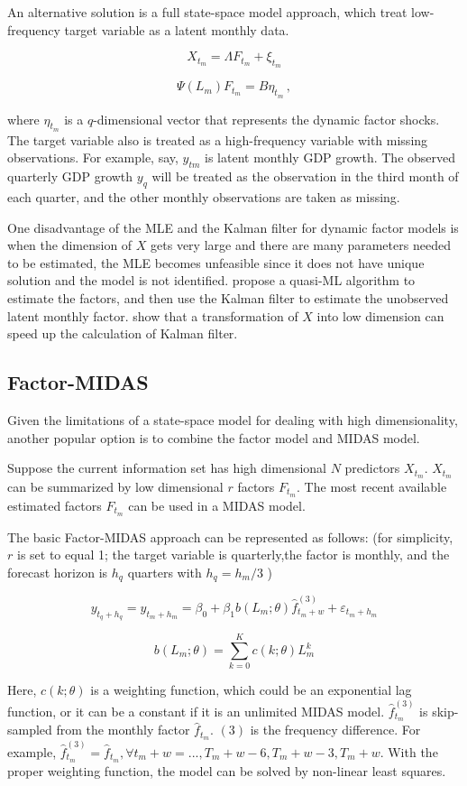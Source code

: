 An alternative solution is a full state-space model approach, which treat low-frequency target variable as a latent monthly data.   

$$X_{t_m} = \Lambda F_{t_m} + \xi_{t_m}$$

$$\Psi (L_m) F_{t_m} = B \eta_{t_m} \, ,$$

where $\eta_{t_m}$ is a $q$-dimensional vector that represents the dynamic factor shocks. The target variable also is treated as a high-frequency variable with missing observations. For example, say, $y_{tm}$ is latent monthly GDP growth. The observed quarterly GDP growth $y_q$ will be treated as the observation in the third month of each quarter, and the other monthly observations are taken as missing.

One disadvantage of the MLE and the Kalman filter for dynamic factor models is when the dimension of $X$  gets very large and there are many parameters needed to be estimated, the MLE becomes unfeasible since it does not have unique solution and the model is not identified.    propose a quasi-ML algorithm to estimate the factors, and then use the Kalman filter  to estimate the unobserved latent monthly factor.   show that a transformation of $X$ into low dimension can speed up the calculation of Kalman filter. 


\subsection{Factor-MIDAS}
Given the limitations of a state-space model for dealing with high dimensionality, another popular option is to combine the factor model and MIDAS model. 

Suppose the current information set has high dimensional $N$  predictors $X_{t_m}$. $X_{t_m}$ can be summarized by low dimensional $r$ factors $F_{t_m}$. The most recent available estimated factors $F_{t_m}$ can be used in a MIDAS model. 


The basic Factor-MIDAS approach can be represented as follows: (for simplicity, $r$ is set to equal 1; the target variable is quarterly,the factor is monthly, and the forecast horizon is $h_q$ quarters with $h_q = h_m /3$ )

$$y_{t_q+ h_q} = y_{t_m + h_m} = \beta_0 + \beta_1 b(L_m ; \theta) \hat f_{t_m +w}^{(3)} + \varepsilon_{t_m+ h_m}$$

$$b(L_m ; \theta) = \sum_{k=0}^K c(k; \theta) L_m^k$$

Here, $c(k; \theta)$ is a weighting function, which could be an exponential lag function, or it can be a constant if it is an unlimited MIDAS model. $\hat f_{t_m}^{(3)}$ is skip-sampled from the monthly factor $\hat f_{t_m}$. $(3)$ is the frequency difference. For example, $\hat f_{t_m}^{(3)} =  \hat f_{t_m}, \forall t_m + w = ..., T_m + w -6, T_m + w -3, T_m + w$. With the proper weighting function, the model can be solved by non-linear least squares. 





